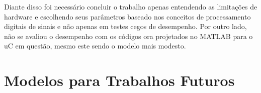 		Diante disso foi necessário concluir o trabalho apenas entendendo as limitações de hardware e escolhendo seus parâmetros baseado nos conceitos de processamento digitais de sinais e não apenas em testes cegos de desempenho. Por outro lado, não se avaliou o desempenho com os códigos ora projetados no MATLAB para o uC em questão, mesmo este sendo o modelo mais modesto.
		
	\section{Modelos para Trabalhos Futuros}
	